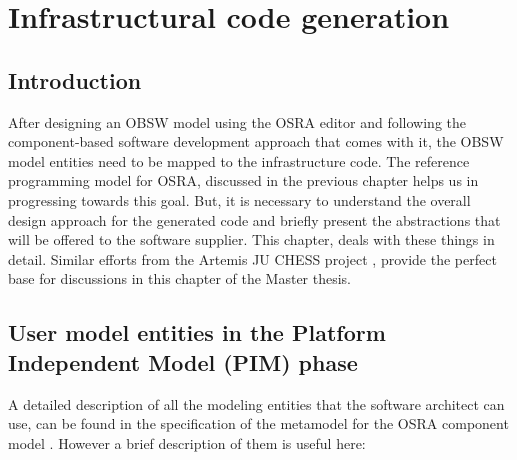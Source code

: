 
\chapter{Infrastructural code generation}
\label{chap: Code generation}
\section{Introduction}
After designing an OBSW model using the OSRA editor and following the component-based software development approach that comes with it, the OBSW model entities need to be mapped to the infrastructure code. The reference programming model for OSRA, discussed in the previous chapter helps us in progressing towards this goal. But, it is necessary to understand the overall design approach for the generated code and briefly present the abstractions that will be offered to the software supplier. This chapter, deals with these things in detail. Similar efforts from the Artemis JU CHESS project \cite{EvoRAVCodeAr}, provide the perfect base for discussions in this chapter of the Master thesis.   

\section{User model entities in the Platform Independent Model (PIM) phase}
A detailed description of all the modeling entities that the software architect can use, can be found in the specification of the metamodel for the OSRA component model \cite{SpecMetamodel}. However a brief description of them is useful here:
 
